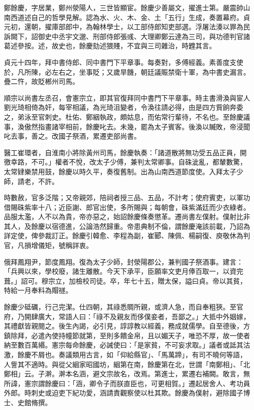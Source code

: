 
\begin{pinyinscope}

 鄭餘慶，字居業，鄭州滎陽人，三世皆顯宦。餘慶少善屬文，擢進士第。嚴震帥山南西道述自己的哲學見解。認為水、火、木、金、土「五行」生成，奏置幕府。貞元初，還朝，擢庫部郎中，為翰林學士，以工部侍郎知吏部選。浮屠法湊以罪為民訴闕下，詔御史中丞宇文邈、刑部侍郎張彧、大理卿鄭云達為三司，與功德判官諸葛述參按。述，故史也，餘慶劾述猥賤，不宜與三司雜治，時韙其言。



 貞元十四年，拜中書侍郎、同中書門下平章事。每奏對，多傅經義。素善度支使於，凡所陳，必左右之，坐事貶；又歲旱饑，朝廷議賑禁衛十軍，為中書史漏言。疊二忤，故貶郴州司馬。



 順宗以尚書左丞召，會憲宗立，即其官復拜同中書門下平章事。時主書滑渙與宦人劉光琦相倚為奸，每宰相議，為光琦沮變者，令渙往請必得，由是四方貲餉奔委之，弟泳至官刺史。杜佑、鄭絪執政，頗姑息，而佑常行輩待，不名也。至餘慶議事，渙傲然指畫諸宰相前，餘慶叱去。未幾，罷為太子賓客。後渙以贓敗，帝浸聞叱去事，善之。改國子祭酒，累遷吏部尚書。



 醫工崔環者，自淮南小將除黃州司馬，餘慶執奏：「諸道散將無功受五品正員，開徼幸路，不可。」權者不悅，改太子少傅，兼判太常卿事。自硃泚亂，都輦數驚，太常肄樂禁用鼓，餘慶以時久平，奏復舊制。出為山南西道節度使。入拜太子少師，請老，不許。



 時數赦，官多泛階；又帝親郊，陪祠者授三品、五品，不計考；使府賓吏，以軍功借賜硃紫率十八；近臣謝、郎官出使，多所賜與；每朝會，硃紫滿廷而少衣綠者。品服太濫，人不以為貴，帝亦惡之，始詔餘慶條奏懲革。遷尚書左僕射。僕射比非其人，及餘慶以宿德進，公論浩然歸重。帝患典制不倫，謂餘慶淹該前載，乃詔為詳定使，俾參裁訂正。餘慶引韓愈、李程為副，崔郾、陳佩、楊嗣復、庾敬休為判官，凡損增儀矩，號稱詳衷。



 俄拜鳳翔尹，節度鳳翔。復為太子少師，封滎陽郡公，兼判國子祭酒事。建言：「兵興以來，學校廢，諸生離散。今天下承平，臣願率文吏月俸百取一，以資完葺。」詔可。穆宗立，加檢校司徒。卒，年七十五，贈太保，謚曰貞。帝以其貧，特給一月奉料為賵禭。



 餘慶少砥礪，行己完潔。仕四朝，其祿悉賙所親，或濟人急，而自奉粗狹。至官府，乃開肆廣大，常語人曰：「祿不及親友而侈僕妾者，吾鄙之。」大抵中外姻嫁，其禮獻皆親閱之。後生內謁，必引見，諄諄教以經義，務成就儒學。自至德後，方鎮除拜，必遣內使持幢節就第，至則多饋金帛，且以媚天子，唯恐不厚，故一使者納至數百萬緡。憲宗每命餘慶，必誡使曰：「是家貧，不可妄求取。」議者或詆其沽激，餘慶不屑也。奏議類用古言，如「仰給縣官」、「馬萬蹄」，有司不曉何等語，人訾其不適時。與從父絪家昭國坊，絪第在南，餘慶第在北，世謂「南鄭相」、「北鄭相」云。子澣。澣本名涵，避文宗故名，改焉。第進士，累遷右補闕。敢言，無所諱，憲宗謂餘慶曰：「涵，卿令子而朕直臣也，可更相賀。」遷起居舍人、考功員外郎。時刺史或迫吏下紀功愛，涵請責觀察使以杜其欺。餘慶為僕射，避除國子博士、史館脩撰。




\end{pinyinscope}
